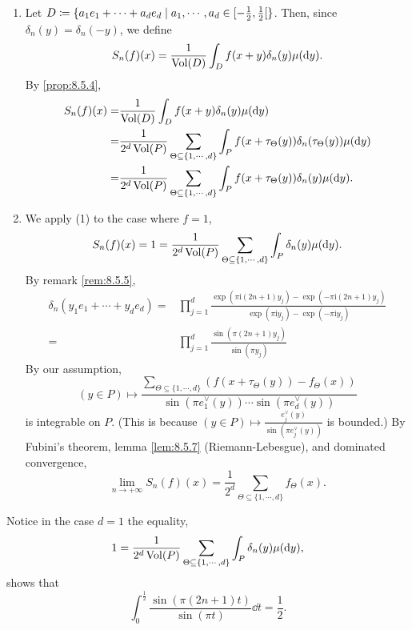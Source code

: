 \begin{proofenv}
    \quad
    \begin{enumerate}[label = (\arabic*)]
        \item Let $D \coloneq \{a_1 e_1 + \cdots + a_d e_d \mid a_1, \cdots, a_d \in \interval[open right]{-\frac{1}{2}}{\frac{1}{2}}\}$.
            Then, since $\delta_{n}(y) = \delta_{n} (-y)$, we define
            $$S_n(f)(x) = \frac{1}{\operatorname{\mathrm{Vol}}(D)} \int_{D} f(x + y)\delta_{n}(y) \mu(\mathrm{d} y).$$
            By \ref{prop:8.5.4},
            $$\begin{aligned}
                S_{n}(f)(x) = & \frac{1}{\operatorname{\mathrm{Vol}}(D)} \int_{D} f(x + y) \delta_{n}(y) \mu(\mathrm{d} y)\\
                = & \frac{1}{2^d \operatorname{\mathrm{Vol}}(P)} \sum_{\Theta \subseteq \{1,\cdots,d\}} \int_{P} f(x + \tau_{\Theta}(y)) \delta_{n}(\tau_{\Theta}(y))\mu(\mathrm{d} y)\\
                = & \frac{1}{2^d \operatorname{\mathrm{Vol}}(P)} \sum_{\Theta \subseteq \{1,\cdots,d\}} \int_{P} f(x + \tau_{\Theta}(y)) \delta_{n}(y)\mu(\mathrm{d} y).
            \end{aligned}$$
        \item We apply (1) to the case where $f = 1$,
            $$S_n(f) (x) = 1 = \frac{1}{2^d \operatorname{\mathrm{Vol}}(P)} \sum_{\Theta \subseteq \{1,\cdots,d\}} \int_{P} \delta_{n} (y) \mu(\mathrm{d} y).$$
            By remark \ref{rem:8.5.5},
            $$\begin{aligned}
                \delta_{n}(y_1 e_1 + \cdots + y_d e_d) = & \prod_{j=1}^{d} \frac{\exp(\pi \mathrm{i} (2n + 1) y_{j}) - \exp(-\pi \mathrm{i} (2n + 1)y_{j})}{\exp(\pi \mathrm{i} y_{j}) - \exp(-\pi \mathrm{i} y_{j})}\\
                = & \prod_{j=1}^{d} \frac{\sin(\pi (2n + 1) y_j)}{\sin (\pi y_j)}
            \end{aligned}$$
            By our assumption,
            $$(y \in P) \longmapsto \frac{\sum_{\Theta \subseteq \{1,\cdots,d\}}(f(x + \tau_{\Theta}(y)) - f_{\Theta}(x))}{\sin(\pi e_1^\vee(y)) \cdots \sin(\pi e_d^\vee(y))}$$
            is integrable on $P$.
            (This is because $(y \in P) \longmapsto \frac{e_j^\vee (y)}{\sin(\pi e_j^\vee(y))}$ is bounded.)
            By Fubini's theorem, lemma \ref{lem:8.5.7} (Riemann-Lebesgue), and dominated convergence,
            $$\lim_{n \to +\infty} S_{n}(f) (x) = \frac{1}{2^d} \sum_{\Theta \subseteq \{1,\cdots,d\}} f_{\Theta}(x).$$
    \end{enumerate}
\end{proofenv}

\begin{remark}\label{rem:8.5.9}
    Notice in the case $d = 1$ the equality,
    $$1 = \frac{1}{2^d \operatorname{\mathrm{Vol}}(P)} \sum_{\Theta \subseteq \{1,\cdots,d\}} \int_{P} \delta_{n}(y) \mu(\mathrm{d} y),$$
    shows that
    $$\int_{0}^{\frac{1}{2}} \frac{\sin(\pi (2n + 1) t)}{\sin(\pi t)} \dd t = \frac{1}{2}.$$
\end{remark}

